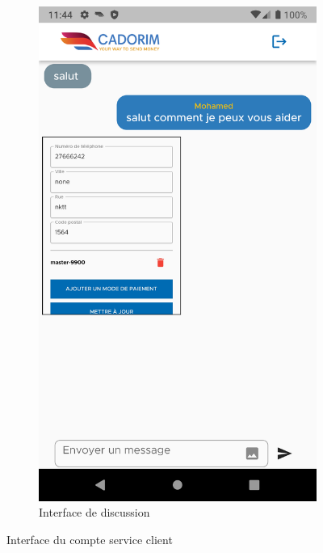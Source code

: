 \begin{itemize}[label=$\ast$]
\begin{figure}
\begin{subfigure}{0.3\textwidth}
		\includegraphics[width=\hsize, valign=m ]{./Template LaTeX/Images/From_emu/b.png}
		\caption{Interface de discussion}
		\label{klk}
	\end{subfigure}
	\caption{Interface du compte service client
	}
	\label{serviceCl}
\end{figure}
\end{itemize}


